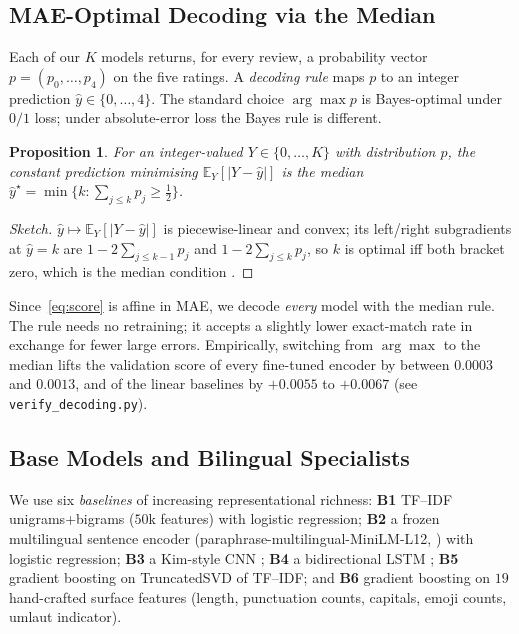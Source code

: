 \documentclass{article}
\theoremstyle{plain}
\newtheorem{proposition}[theorem]{Proposition}
\begin{document}
\subsection{MAE-Optimal Decoding via the Median}
\label{sec:decoding}

Each of our $K$ models returns, for every review, a probability
vector $p=(p_0,\dots,p_4)$ on the five ratings. A \emph{decoding rule}
maps $p$ to an integer prediction $\hat y\in\{0,\dots,4\}$. The
standard choice $\arg\max p$ is Bayes-optimal under $0/1$ loss; under
absolute-error loss the Bayes rule is different.

\begin{proposition}\label{prop:median}
For an integer-valued $Y\in\{0,\dots,K\}$ with distribution $p$, the
constant prediction minimising $\mathbb E_Y[|Y-\hat y|]$ is the
\emph{median} $\hat y^\star=\min\{k:\sum_{j\le k}p_j\ge \tfrac{1}{2}\}$.
\end{proposition}

\begin{proof}[Sketch]
$\hat y\mapsto \mathbb E_Y[|Y-\hat y|]$ is piecewise-linear and convex;
its left/right subgradients at $\hat y=k$ are $1-2\sum_{j\le k-1}p_j$
and $1-2\sum_{j\le k}p_j$, so $k$ is optimal iff both bracket zero,
which is the median condition \citep{koltchinskii1997median}.
\end{proof}

Since~\eqref{eq:score} is affine in MAE, we decode \emph{every} model
with the median rule. The rule needs no retraining; it accepts a
slightly lower exact-match rate in exchange for fewer large errors.
Empirically, switching from $\arg\max$ to the median lifts the
validation score of every fine-tuned encoder by between $0.0003$ and
$0.0013$, and of the linear baselines by $+0.0055$ to $+0.0067$ (see
\texttt{verify\_decoding.py}).

\subsection{Base Models and Bilingual Specialists}
\label{sec:specialists}

We use six \emph{baselines} of increasing representational richness:
\textbf{B1} TF--IDF unigrams+bigrams ($50$k features) with logistic
regression; \textbf{B2} a frozen multilingual sentence encoder
(paraphrase-multilingual-MiniLM-L12, \citealt{reimers2019sbert}) with
logistic regression; \textbf{B3} a Kim-style CNN \cite{kim2014cnn};
\textbf{B4} a bidirectional LSTM \cite{hochreiter1997lstm};
\textbf{B5} gradient boosting on TruncatedSVD of TF--IDF; and
\textbf{B6} gradient boosting on $19$ hand-crafted surface features
(length, punctuation counts, capitals, emoji counts, umlaut
indicator).
\end{document}
